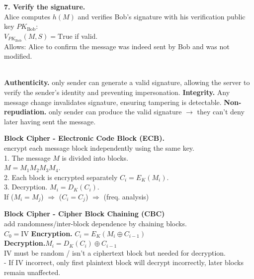 \documentclass[main.tex]{subfiles}
\begin{document}
\begin{minipage}[t]{0.495\textwidth}
\begin{minipage}[t]{0.49\textwidth}
		\textbf{7. Verify the signature.}\\
		Alice computes $h(M)$ and verifies Bob’s signature with his verification public key $PK_{\text{Bob}}$:\\
		$V_{PK_{\text{Bob}}}(M, S) = \text{True}$ if valid.\\
		Allows: Alice to confirm the message was indeed sent by Bob and was not modified.
	\end{minipage}\\
	\textbf{Authenticity.} only sender can generate a valid signature, allowing the server to verify the sender’s identity and preventing impersonation. \textbf{Integrity.} Any message change invalidates signature, ensuring tampering is detectable. \textbf{Non-repudiation.} only sender can produce the valid signature $\rightarrow$ they can't deny later having sent the message.	\hline
	\begin{minipage}[t]{0.45\textwidth}
		\textbf{Block Cipher - Electronic Code Block (ECB).}\\ encrypt each message block independently using the same key.\\
		1. The message $M$ is divided into blocks.\\$M = M_1 M_2 M_3 M_4$.\\
			2. Each block is encrypted separately $C_i = E_K(M_i)$.\\
			3. Decryption. $M_i = D_K(C_i)$.\\
			\warning If ($M_i = M_j$) $\Rightarrow$ ($C_i = C_j$) $\Rightarrow$ (freq. analysis)
	\end{minipage}\hfill
	\begin{minipage}[t]{0.53\textwidth}
		\textbf{Block Cipher - Cipher Block Chaining (CBC)} \\
		add randomness/inter-block dependence by chaining blocks.\\
		$C_0 = \text{IV}$ \quad	\textbf{Encryption.} $ C_i = E_K(M_i \oplus C_{i-1})$\\
		\textbf{Decryption.}$M_i = D_K(C_i) \oplus C_{i-1}$\\
		IV must be random / isn't a ciphertext block but needed for decryption.\\
		- If IV incorrect, only first plaintext block will decrypt incorrectly, later blocks remain unaffected.
	\end{minipage}
\end{minipage}
\hfill
\end{document}
